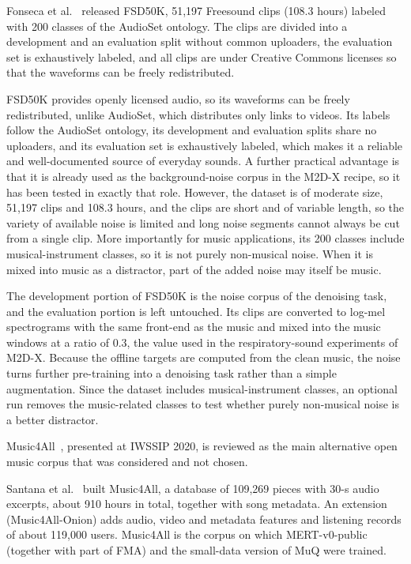 \documentclass{FastFyp}
\begin{document}
\lrsummary
Fonseca et al.~\cite{ref:Fonseca:2022fsd50k} released FSD50K, 51,197 Freesound clips (108.3 hours) labeled with 200 classes of the AudioSet ontology. The clips are divided into a development and an evaluation split without common uploaders, the evaluation set is exhaustively labeled, and all clips are under Creative Commons licenses so that the waveforms can be freely redistributed.

\lrcritical
FSD50K provides openly licensed audio, so its waveforms can be freely redistributed, unlike AudioSet, which distributes only links to videos. Its labels follow the AudioSet ontology, its development and evaluation splits share no uploaders, and its evaluation set is exhaustively labeled, which makes it a reliable and well-documented source of everyday sounds. A further practical advantage is that it is already used as the background-noise corpus in the M2D-X recipe, so it has been tested in exactly that role. However, the dataset is of moderate size, 51,197 clips and 108.3 hours, and the clips are short and of variable length, so the variety of available noise is limited and long noise segments cannot always be cut from a single clip. More importantly for music applications, its 200 classes include musical-instrument classes, so it is not purely non-musical noise. When it is mixed into music as a distractor, part of the added noise may itself be music.

\lrrelation
The development portion of FSD50K is the noise corpus of the denoising task, and the evaluation portion is left untouched. Its clips are converted to log-mel spectrograms with the same front-end as the music and mixed into the music windows at a ratio of 0.3, the value used in the respiratory-sound experiments of M2D-X. Because the offline targets are computed from the clean music, the noise turns further pre-training into a denoising task rather than a simple augmentation. Since the dataset includes musical-instrument classes, an optional run removes the music-related classes to test whether purely non-musical noise is a better distractor.

Music4All~\cite{ref:Santana:2020music4all}, presented at IWSSIP 2020, is reviewed as the main alternative open music corpus that was considered and not chosen.

\lrsummary
Santana et al.~\cite{ref:Santana:2020music4all} built Music4All, a database of 109,269 pieces with 30-s audio excerpts, about 910 hours in total, together with song metadata. An extension (Music4All-Onion) adds audio, video and metadata features and listening records of about 119,000 users. Music4All is the corpus on which MERT-v0-public (together with part of FMA) and the small-data version of MuQ were trained.
\end{document}
